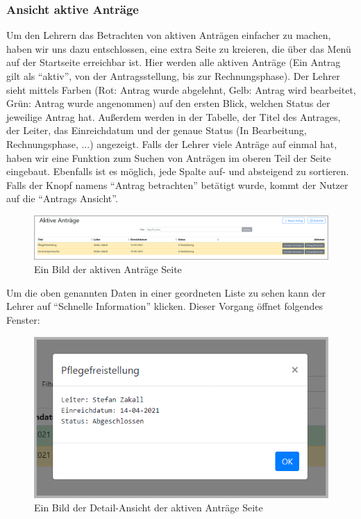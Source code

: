 \subsubsection{Ansicht aktive Anträge}
Um den Lehrern das Betrachten von aktiven Anträgen einfacher zu machen, haben wir uns dazu entschlossen, eine extra Seite zu kreieren, die über das Menü auf der Startseite erreichbar ist. Hier werden alle aktiven Anträge (Ein Antrag gilt als \enquote{aktiv}, von der Antragsstellung, bis zur Rechnungsphase). Der Lehrer sieht mittels Farben (Rot: Antrag wurde abgelehnt, Gelb: Antrag wird bearbeitet, Grün: Antrag wurde angenommen) auf den ersten Blick, welchen Status der jeweilige Antrag hat. Außerdem werden in der Tabelle, der Titel des Antrages, der Leiter, das Einreichdatum und der genaue Status (In Bearbeitung, Rechnungsphase, ...) angezeigt. Falls der Lehrer viele Anträge auf einmal hat, haben wir eine Funktion zum Suchen von Anträgen im oberen Teil der Seite eingebaut. Ebenfalls ist es möglich, jede Spalte auf- und absteigend zu sortieren. Falls der Knopf namens \enquote{Antrag betrachten} betätigt wurde, kommt der Nutzer auf die \enquote{Antrags Ansicht}.
\begin{figure}[H]
	\centering
	\includegraphics[width=1\linewidth]{images/website/aktiv}
	\caption[Aktiv]{Ein Bild der aktiven Anträge Seite}
	\label{fig:antragaktiv}
\end{figure}
Um die oben genannten Daten in einer geordneten Liste zu sehen kann der Lehrer auf \enquote{Schnelle Information} klicken. Dieser Vorgang öffnet folgendes Fenster:
\begin{figure}[H]
	\centering
	\includegraphics[width=0.6\linewidth]{images/website/aktiv_detail}
	\caption[Aktiv]{Ein Bild der Detail-Ansicht der aktiven Anträge Seite}
	\label{fig:antragaktivdetail}
\end{figure}
